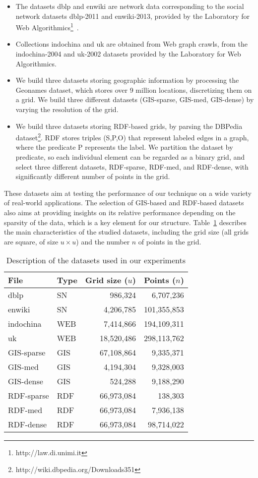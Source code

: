 \documentclass{elsarticle}
\newcommand{\dblp}{\textsf{dblp}\xspace}
\newcommand{\enwiki}{\textsf{enwiki}\xspace}
\newcommand{\indo}{\textsf{indochina}\xspace}
\newcommand{\uk}{\textsf{uk}\xspace}
\newcommand{\giss}{\textsf{GIS-sparse}\xspace}
\newcommand{\gism}{\textsf{GIS-med}\xspace}
\newcommand{\gisd}{\textsf{GIS-dense}\xspace}
\newcommand{\rdfs}{\textsf{RDF-sparse}\xspace}
\newcommand{\rdfm}{\textsf{RDF-med}\xspace}
\newcommand{\rdfd}{\textsf{RDF-dense}\xspace}
\begin{document}
\begin{itemize}
\item The datasets \dblp and \enwiki are network data corresponding to the social network datasets dblp-2011 and enwiki-2013, provided by the Laboratory for Web Algorithmics\footnote{{http://law.di.unimi.it}}~\cite{BoVWFI,BRSLLP}.
\item Collections \indo and \uk are obtained from Web graph crawls, from the indochina-2004 and uk-2002 datasets provided by the Laboratory for Web Algorithmics.
\item We build three datasets storing geographic information by processing the Geonames dataset, which stores over 9 million locations, discretizing them on a grid. We build three different datasets (\giss, \gism, \gisd) by varying the resolution of the grid.
\item We build three datasets storing RDF-based grids, by parsing the DBPedia dataset\footnote{http://wiki.dbpedia.org/Downloads351}. RDF stores triples (S,P,O) that represent labeled edges in a graph, where the predicate P represents the label. We partition the dataset by predicate, so each individual element can be regarded as a binary grid, and select three different datasets, \rdfs, \rdfm, and \rdfd, with significantly different number of points in the grid.
\end{itemize}

These datasets aim at testing the performance of our technique on a wide variety of real-world applications. The selection of GIS-based and RDF-based datasets also aims at providing insights on its relative performance depending on the sparsity of the data, which is a key element for our structure. Table~\ref{tab:datasets} describes the main characteristics of the studied datasets, including the grid size (all grids are square, of size $u \times u$) and the number $n$ of points in the grid.


\begin{table}
\centering

\begin{tabular}{ l | l | r r }
 File  & Type & Grid size ($u$) & Points ($n$) \\
 \hline
\dblp       & SN  &     986,324 &   6,707,236 \\
\enwiki     & SN  &   4,206,785 & 101,355,853 \\
\hline
\indo  & WEB &   7,414,866 & 194,109,311 \\
\uk         & WEB &  18,520,486 & 298,113,762 \\
\hline
\giss   & GIS &  67,108,864 &   9,335,371 \\
\gism      & GIS &   4,194,304 &   9,328,003 \\
\gisd    & GIS &     524,288 &   9,188,290 \\
\hline
\rdfs  & RDF &  66,973,084 &     138,303 \\
\rdfm   & RDF &  66,973,084 &   7,936,138 \\
\rdfd   & RDF &  66,973,084 &  98,714,022 \\
\hline
\end{tabular}
\caption{Description of the datasets used in our experiments}
\label{tab:datasets}
\end{table}
\end{document}
